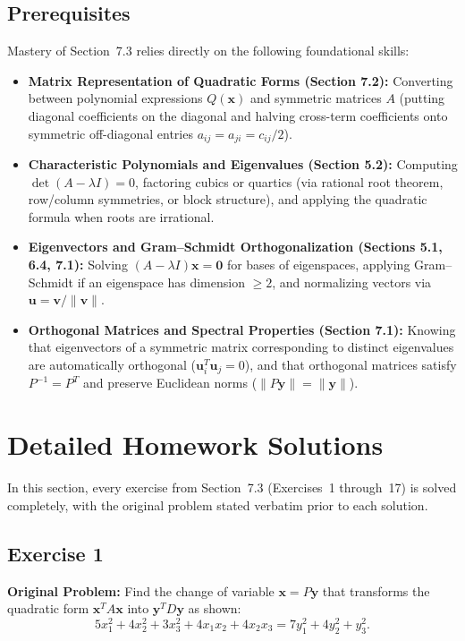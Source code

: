 \documentclass[11pt, letterpaper]{article}
\theoremstyle{definition}
\theoremstyle{remark}
\begin{document}
\subsection{Prerequisites}
Mastery of Section~7.3 relies directly on the following foundational skills:
\begin{itemize}
    \item \textbf{Matrix Representation of Quadratic Forms (Section 7.2):} Converting between polynomial expressions $Q(\mathbf{x})$ and symmetric matrices $A$ (putting diagonal coefficients on the diagonal and halving cross-term coefficients onto symmetric off-diagonal entries $a_{ij} = a_{ji} = c_{ij}/2$).
    \item \textbf{Characteristic Polynomials and Eigenvalues (Section 5.2):} Computing $\det(A - \lambda I) = 0$, factoring cubics or quartics (via rational root theorem, row/column symmetries, or block structure), and applying the quadratic formula when roots are irrational.
    \item \textbf{Eigenvectors and Gram–Schmidt Orthogonalization (Sections 5.1, 6.4, 7.1):} Solving $(A - \lambda I)\mathbf{x} = \mathbf{0}$ for bases of eigenspaces, applying Gram–Schmidt if an eigenspace has dimension $\ge 2$, and normalizing vectors via $\mathbf{u} = \mathbf{v}/\|\mathbf{v}\|$.
    \item \textbf{Orthogonal Matrices and Spectral Properties (Section 7.1):} Knowing that eigenvectors of a symmetric matrix corresponding to distinct eigenvalues are automatically orthogonal ($\mathbf{u}_i^T \mathbf{u}_j = 0$), and that orthogonal matrices satisfy $P^{-1} = P^T$ and preserve Euclidean norms ($\|P\mathbf{y}\| = \|\mathbf{y}\|$).
\end{itemize}

\section{Detailed Homework Solutions}

In this section, every exercise from Section~7.3 (Exercises~1 through~17) is solved completely, with the original problem stated verbatim prior to each solution.

\subsection{Exercise 1}
\textbf{Original Problem:} Find the change of variable $\mathbf{x} = P\mathbf{y}$ that transforms the quadratic form $\mathbf{x}^T A \mathbf{x}$ into $\mathbf{y}^T D \mathbf{y}$ as shown:
\[
5x_1^2 + 4x_2^2 + 3x_3^2 + 4x_1x_2 + 4x_2x_3 = 7y_1^2 + 4y_2^2 + y_3^2.
\]
\end{document}
